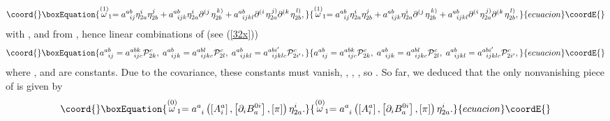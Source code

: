\documentclass[a4paper,12pt]{article}
\begin{document}
\begin{equation}\coord{}\boxEquation{
\stackrel{\left( 1\right) }{\omega }_{1}=a_{\;\;ij}^{ab}\eta _{2a}^{i}\eta
_{2b}^{j}+a_{\;\;ijk}^{ab}\eta _{2a}^{i}\partial ^{\left( j\right. }\eta
_{2b}^{\left. k\right) }+a_{\;\;ijkl}^{ab}\partial ^{\left( i\right. }\eta
_{2a}^{\left. j\right) }\partial ^{\left( k\right. }\eta _{2b}^{\left.
l\right) },  \label{33xa}
}{
\stackrel{\left( 1\right) }{\omega }_{1}=a_{\;\;ij}^{ab}\eta _{2a}^{i}\eta
_{2b}^{j}+a_{\;\;ijk}^{ab}\eta _{2a}^{i}\partial ^{\left( j\right. }\eta
_{2b}^{\left. k\right) }+a_{\;\;ijkl}^{ab}\partial ^{\left( i\right. }\eta
_{2a}^{\left. j\right) }\partial ^{\left( k\right. }\eta _{2b}^{\left.
l\right) },  }{ecuacion}\coordE{}\end{equation}
with \coordHE{}, \coordHE{} and \coordHE{} from \coordHE{}, hence linear combinations of \coordHE{} (see (\ref{32x})) 
\begin{equation}\coord{}\boxEquation{
a_{\;\;ij}^{ab}=a_{\;\;ijc}^{abk}\mathcal{P}_{2k}^{c},\;a_{\;\;ijk}^{ab}=a_{
\;\;ijkc}^{abl}\mathcal{P}_{2l}^{c},\;a_{\;\;ijkl}^{ab}=a_{\;\;ijklc}^{abi^{
\prime }}\mathcal{P}_{2i^{\prime }}^{c},  \label{34x}
}{
a_{\;\;ij}^{ab}=a_{\;\;ijc}^{abk}\mathcal{P}_{2k}^{c},\;a_{\;\;ijk}^{ab}=a_{
\;\;ijkc}^{abl}\mathcal{P}_{2l}^{c},\;a_{\;\;ijkl}^{ab}=a_{\;\;ijklc}^{abi^{
\prime }}\mathcal{P}_{2i^{\prime }}^{c},  }{ecuacion}\coordE{}\end{equation}
where \coordHE{}, \coordHE{} and \coordHE{} are constants. Due to the covariance, these constants must
vanish, \coordHE{}, \coordHE{}, \coordHE{}, so \coordHE{}. So far, we
deduced that the only nonvanishing piece of \coordHE{} is given by 
\begin{equation}\coord{}\boxEquation{
\stackrel{\left( 0\right) }{\omega }_{1}=a_{\;\;i}^{a}\left( \left[
A_{i}^{a}\right] ,\left[ \partial _{i}B_{a}^{0i}\right] ,\left[ \pi \right]
\right) \eta _{2a}^{i}.  \label{35x}
}{
\stackrel{\left( 0\right) }{\omega }_{1}=a_{\;\;i}^{a}\left( \left[
A_{i}^{a}\right] ,\left[ \partial _{i}B_{a}^{0i}\right] ,\left[ \pi \right]
\right) \eta _{2a}^{i}.  }{ecuacion}\coordE{}\end{equation}
\end{document}
